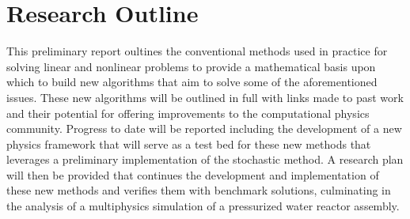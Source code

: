 \section{Research Outline}
\label{sec:research_outline}
This preliminary report oultines the conventional methods used in
practice for solving linear and nonlinear problems to provide a
mathematical basis upon which to build new algorithms that aim to
solve some of the aforementioned issues. These new algorithms will be
outlined in full with links made to past work and their potential for
offering improvements to the computational physics community. Progress
to date will be reported including the development of a new physics
framework that will serve as a test bed for these new methods that
leverages a preliminary implementation of the stochastic method. A
research plan will then be provided that continues the development and
implementation of these new methods and verifies them with benchmark
solutions, culminating in the analysis of a multiphysics simulation of
a pressurized water reactor assembly.
